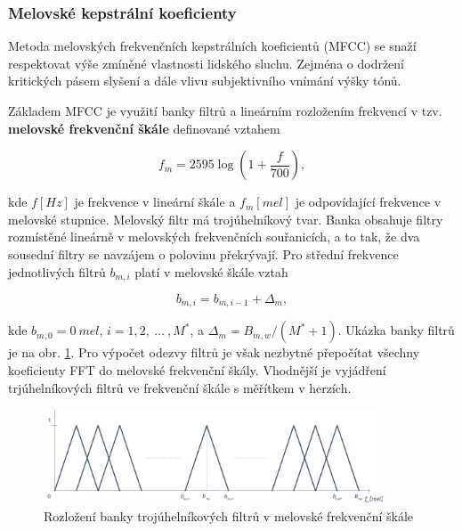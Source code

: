 \subsubsection{Melovské kepstrální koeficienty}

Metoda melovských frekvenčních kepstrálních koeficientů (MFCC) se snaží respektovat výše zmíněné vlastnosti lidského sluchu. Zejména o dodržení kritických pásem slyšení a dále vlivu subjektivního vnímání výšky tónů.

Základem MFCC je využití banky filtrů a lineárním rozložením frekvencí v tzv. \textbf{melovské frekvenční škále} definované vztahem

\begin{equation}
  f_m = 2595 \log \left(1 + \frac{f}{700}\right),
  \label{eq:asr:mfcc:melscale}
\end{equation}

\noindent kde $f \left[Hz\right]$ je frekvence v lineární škále a $f_m \left[mel\right]$ je odpovídající frekvence v melovské stupnice. Melovský filtr má trojúhelníkový tvar. Banka obsahuje filtry rozmístěné lineárně v melovských frekvenčních souřanicích, a to tak, že dva sousední filtry se navzájem o polovinu překrývají. Pro střední frekvence jednotlivých filtrů $b_{m,i}$ platí v melovské škále vztah

\begin{equation}
  b_{m,i} = b_{m,i-1} + \Delta_{m},
  \label{eq:asr:mfcc:freq}
\end{equation}

\noindent kde $b_{m, 0} = 0\ mel$, $i = 1, 2,\ \dots\ , M^{*}$, a $\Delta_m = B_{m,w} / (M^{*} + 1)$. Ukázka banky filtrů je na obr. \ref{fig:asr:mfcc:bank:mel}. Pro výpočet odezvy filtrů je však nezbytné přepočítat všechny koeficienty FFT do melovské frekvenční škály. Vhodnější je vyjádření trjúhelníkových filtrů ve frekvenční škále s měřítkem v herzích.

\begin{figure}[hbpt]
  \centering
  \includegraphics[width=0.9\textwidth]{./ch4-asr/img/filter_bank-mel.pdf}
  \caption{Rozložení banky trojúhelníkových filtrů v melovské frekvenční škále}
  \label{fig:asr:mfcc:bank:mel}
\end{figure}


